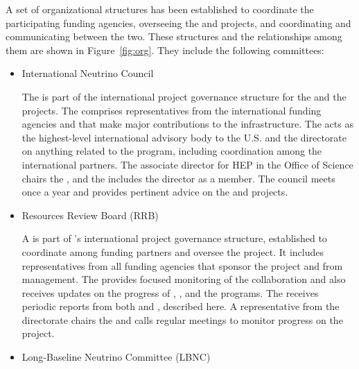A set  of  organizational structures  has been established  to
coordinate  the  participating  funding agencies,
overseeing the  and  projects,
and coordinating and communicating between the 
two. These structures and the relationships among them are shown 
in Figure~\ref{fig:org}. They include %
the following committees:
\begin{itemize}
\item International Neutrino Council 

The  is part of the international project governance structure for the   and the   projects. The  comprises representatives from the international funding agencies and   that make major contributions to the infrastructure. 
The  acts as the highest-level international advisory body to the U.S.   and the   directorate on anything related to the program, including coordination among the international partners. The associate director for HEP in the  Office of Science chairs the , and the  includes the   director as a member. The council meets once a year and provides pertinent advice on the  and   projects.

\item Resources Review Board (RRB)

A  is part of 's international project governance structure, %
established to coordinate among funding partners and oversee the  project. It includes representatives from all funding agencies that sponsor the project and  from  management. The   provides focused monitoring of the  collaboration and also receives updates on the progress of ,  , and the  programs. The   receives periodic reports from both  and , described here. %
A representative from the  directorate chairs the  and calls regular meetings to monitor progress on the  project.



\item Long-Baseline Neutrino Committee (LBNC)


\end{itemize}

